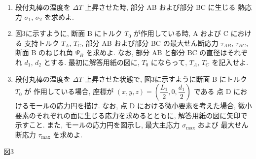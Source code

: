 \begin{enumerate}[label=(\arabic*)]
  \item 段付丸棒の温度を $\Delta T$ 上昇させた時, 部分 AB および部分 BC に生じる
        熱応力 $\sigma_1$, $\sigma_2$ を求めよ.

  \item 図3に示すように, 断面 B にトルク $T_0$ が作用している時, A および C における
        支持トルク $T_A$, $T_C$, 部分 AB および部分 BC の最大せん断応力 $\tau_{AB}$, $\tau_{BC}$,
        断面 B のねじれ角 $\Psi_B$ を求めよ. なお, 部分 AB と部分 BC の直径はそれぞれ
        $d_1$, $d_2$ とする. 最初に解答用紙の図に, $T_0$ にならって, $T_A$, $T_C$ を記入せよ.

  \item 段付丸棒の温度を $\Delta T$ 上昇させた状態で, 図3に示すように断面 B にトルク $T_0$ が
        作用している場合, 座標が $(x,y,z)=\left(\dfrac{L_1}{2},0,\dfrac{d_1}{2}\right)$ である
        点 D におけるモールの応力円を描け. なお, 点 D における微小要素を考えた場合,
        微小要素のそれぞれの面に生じる応力を求めるとともに, 解答用紙の図に矢印で示すこと.
        また, モールの応力円を図示し, 最大主応力 $\sigma_{\max}$ および
        最大せん断応力 $\tau_{\max}$ を求めよ.
\end{enumerate}

\begin{center}

図3
\end{center}
